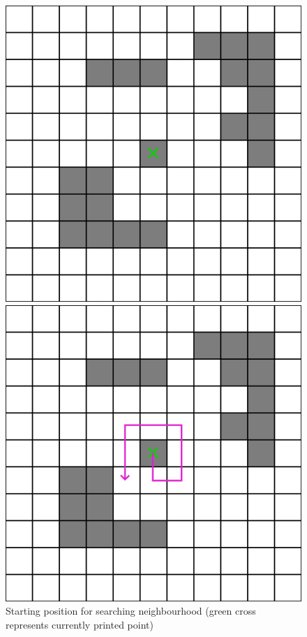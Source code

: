 \documentclass[titlepage]{article}
\newcommand{\multifigcaption}{\captionsetup{justification=justified}}
\begin{document}
\begin{figure}[H]
 	\begin{center}
 		\begin{minipage}{0.45\linewidth}
 			\includegraphics[width=\textwidth]{img/greedy/example-neighbours-starting.png}
 			\multifigcaption
 			\caption{Starting position for searching neighbourhood (green cross represents currently printed point)}
 			\label{img:greedy/example-neighbours-stating}
 		\end{minipage}
 		\hspace{.05\linewidth}
 		\begin{minipage}{.45\linewidth}
 			\includegraphics[width=\textwidth]{img/greedy/example-neighbours-neigh-1.png}

\end{minipage}
\end{center}
\end{figure}
\end{document}
